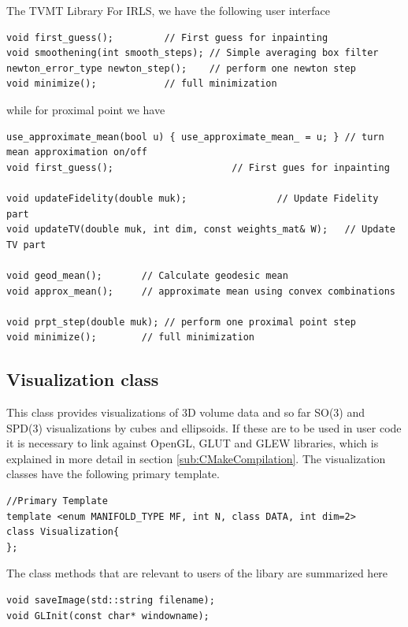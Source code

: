 \begin{chapter}{The TVMT Library}
For IRLS, we have the following user interface\\
\cppinline
\begin{lstlisting}
void first_guess();		    // First guess for inpainting
void smoothening(int smooth_steps); // Simple averaging box filter
newton_error_type newton_step();    // perform one newton step
void minimize();		    // full minimization
\end{lstlisting}

while for proximal point we have\\
\cppinline
\begin{lstlisting}
use_approximate_mean(bool u) { use_approximate_mean_ = u; } // turn mean approximation on/off
void first_guess();					    // First gues for inpainting
 
void updateFidelity(double muk);			    // Update Fidelity part
void updateTV(double muk, int dim, const weights_mat& W);   // Update TV part

void geod_mean();	    // Calculate geodesic mean
void approx_mean();	    // approximate mean using convex combinations

void prpt_step(double muk); // perform one proximal point step
void minimize();	    // full minimization
\end{lstlisting}



\subsection{Visualization class} %
\label{sub:Visualization class}
This class provides visualizations of 3D volume data and so far SO(3) and SPD(3) visualizations by cubes and ellipsoids. If these are to be used in user code it is necessary to link
against OpenGL, GLUT and GLEW libraries, which is explained in more detail in section \ref{sub:CMakeCompilation}. The visualization classes have the following primary template.
\cppinline
\begin{lstlisting}
//Primary Template
template <enum MANIFOLD_TYPE MF, int N, class DATA, int dim=2>
class Visualization{
};
\end{lstlisting}

The class methods that are relevant to users of the libary are summarized here\\
\cppinline
\begin{lstlisting}
void saveImage(std::string filename);
void GLInit(const char* windowname);


\end{lstlisting}
\end{chapter}

